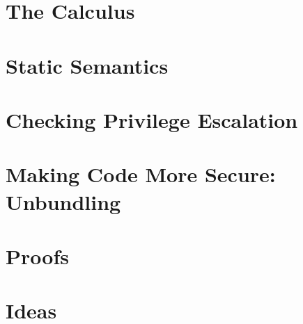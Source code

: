 \documentclass[[12pt,a4paper,twoside,openrigh]{report}
\begin{document}
\section{The Calculus}
\label{sec:calculus}


\section{Static Semantics}
\label{sec:statics}


\section{Checking Privilege Escalation}
\label{sec:privesc}

\newpage

\section{Making Code More Secure: Unbundling}
\label{sec:flow}

\newpage

\section{Proofs}
\label{sec:proofs}

\newpage

\section{Ideas}
\label{sec:ideas}
\end{document}
